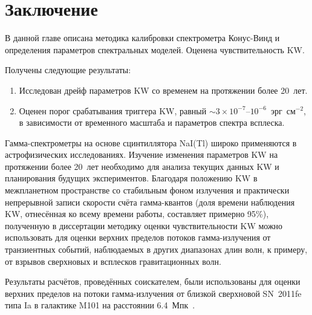 \FloatBarrier
\section{Заключение}
В данной главе описана методика калибровки спектрометра Конус-Винд и определения
параметров спектральных моделей. Оценена чувствительность KW. 

Получены следующие результаты:
\begin{enumerate}
\item Исследован дрейф параметров KW со временем на протяжении более 20~лет.
\item Оценен порог срабатывания триггера KW, равный $\sim 3\times10^{-7}$--$10^{-6}$~эрг~см$^{-2}$,
в зависимости от временного масштаба и параметров спектра всплеска.
\end{enumerate}

Гамма-спектрометры на основе сцинтиллятора NaI(Tl) широко применяются в астрофизических исследованиях.
Изучение изменения параметров KW на протяжении более 20~лет 
необходимо для анализа текущих данных KW и планирования будущих экспериментов. 
Благодаря положению KW в межпланетном пространстве со стабильным 
фоном излучения и практически непрерывной записи скорости счёта гамма-квантов 
(доля времени наблюдения KW, отнесённая ко всему времени работы, составляет 
примерно 95\%), полученную в диссертации методику оценки чувствительности KW 
можно использовать для оценки верхних пределов потоков гамма-излучения 
от транзиентных событий, наблюдаемых в других диапазонах длин волн, к примеру, 
от взрывов сверхновых и всплесков гравитационных волн.

Результаты расчётов, проведённых соискателем, были использованы для оценки верхних 
пределов на потоки гамма-излучения от близкой сверхновой SN~2011fe типа Ia в 
галактике M101 на расстоянии 6.4~Мпк~\citep{Margutti_2012ApJ}.


\clearpage